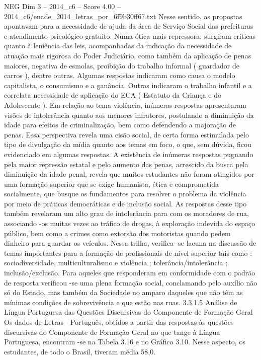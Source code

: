 \begin{textsample}{NEG Dim 3 – 2014\_c6 – Score 4.00 – 2014\_c6/enade\_2014\_letras\_por\_6f9b30ff67.txt}
Nesse sentido, as propostas apontavam para a necessidade de ajuda da área de Serviço Social das prefeituras e atendimento psicológico gratuito.
Numa ótica mais repressora, surgiram críticas quanto à leniência das leis, acompanhadas da indicação da necessidade de atuação mais rigorosa do Poder Judiciário, como também da aplicação de penas maiores, negativa de esmolas, proibição do trabalho informal ( guardador de carros ), dentre outras.
Algumas respostas indicaram como causa o modelo capitalista, o consumismo e a ganância.
Outras indicaram o trabalho infantil e a correlata necessidade de aplicação do ECA ( Estatuto da Criança e do Adolescente ).
Em relação ao tema violência, inúmeras respostas apresentaram visões de intolerância quanto aos menores infratores, postulando a diminuição da idade para efeitos de criminalização, bem como defendendo a majoração de penas.
Essa perspectiva revela uma cisão social, de certa forma estimulada pelo tipo de divulgação da mídia quanto aos temas em foco, o que, sem dúvida, ficou evidenciado em algumas respostas.
A existência de inúmeras respostas pugnando pela maior repressão estatal e pelo aumento das penas, acrescido da busca pela diminuição da idade penal, revela que muitos estudantes não foram atingidos por uma formação superior que se exige humanista, ética e comprometida socialmente, que busque os fundamentos para resolver o problema da violência por meio de práticas democráticas e de inclusão social.
As respostas desse tipo também revelaram um alto grau de intolerância para com os moradores de rua, associando -os muitas vezes ao tráfico de drogas, à exploração indevida do espaço público, bem como a crimes como extorsão dos motoristas quando pedem dinheiro para guardar os veículos.
Nessa trilha, verifica -se lacuna na discussão de temas importantes para a formação de profissionais de nível superior tais como : sociodiversidade, multiculturalismo e violência ; tolerância/intolerância ; inclusão/exclusão.
Para aqueles que responderam em conformidade com o padrão de resposta verificou -se uma plena formação social, conclamando pelo auxílio não só do Estado, mas também da Sociedade no amparo daqueles que não têm as mínimas condições de sobrevivência e que estão nas ruas. 3.3.1.5 Análise de Língua Portuguesa das Questões Discursivas do Componente de Formação Geral Os dados de Letras - Português, obtidos a partir das respostas às questões discursivas do Componente de Formação Geral no que tange à Língua Portuguesa, encontram -se na Tabela 3.16 e no Gráfico 3.10.
Nesse aspecto, os estudantes, de todo o Brasil, tiveram média 58,0.

\end{textsample}
